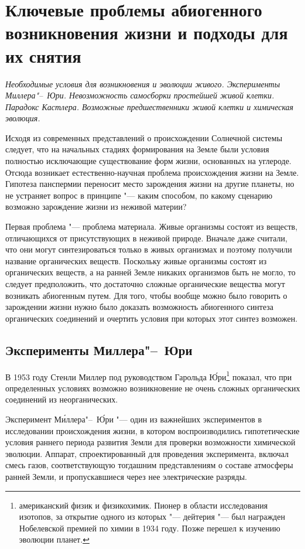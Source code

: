 \documentclass[12pt,a4paper,oneside]{book}
\begin{document}
\newpage
\section{Ключевые проблемы абиогенного возникновения жизни и подходы для их снятия}
{\it Необходимые условия для возникновения и эволюции живого. Эксперименты Миллера"--~Юри. Невозможность самосборки простейшей живой клетки. Парадокс Кастлера. Возможные предшественники живой клетки и химическая эволюция.}

Исходя из современных представлений о происхождении Солнечной системы следует, что на начальных стадиях формирования на Земле были условия полностью исключающие существование форм жизни, основанных на углероде. Отсюда возникает естественно-научная проблема происхождения жизни на Земле. Гипотеза панспермии переносит место зарождения жизни на другие планеты, но не устраняет вопрос в принципе "--- каким способом, по какому сценарию возможно зарождение жизни из неживой материи?

Первая проблема "--- проблема материала. Живые организмы состоят из веществ, отличающихся от присутствующих в неживой природе. Вначале даже считали, что они могут синтезироваться только в живых организмах и поэтому получили название органических веществ. Поскольку живые организмы состоят из органических веществ, а на ранней Земле никаких организмов быть не могло, то следует предположить, что достаточно сложные органические вещества могут возникать абиогенным путем. Для того, чтобы вообще можно было говорить о зарождении жизни нужно было доказать возможность абиогенного синтеза органических соединений и очертить условия при которых этот синтез возможен.

\subsection{Эксперименты Миллера"--~Юри}

В 1953 году Стенли Миллер под руководством Гарольда \'{Ю}ри\footnote{американский физик и физикохимик. Пионер в области исследования изотопов, за открытие одного из которых "--- дейтерия "--- был награжден Нобелевской премией по химии в 1934 году. Позже перешел к изучению эволюции планет.} показал, что при определенных условиях возможно возникновение не очень сложных органических соединений из неорганических.

Эксперимент М\'{и}ллера"--~\'{Ю}ри "--- один из важнейших экспериментов в исследовании происхождения жизни, в котором воспроизводились гипотетические условия раннего периода развития Земли для проверки возможности химической эволюции. Аппарат, спроектированный для проведения эксперимента, включал смесь газов, соответствующую тогдашним представлениям о составе атмосферы ранней Земли, и пропускавшиеся через нее электрические разряды.
\end{document}
